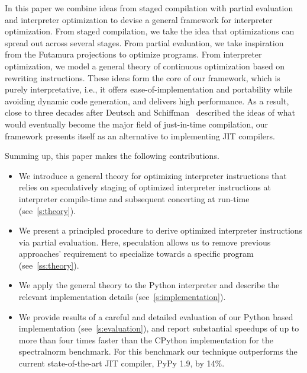 \documentclass[preprint,10pt]{popl14conf}
\begin{document}
In this paper we combine ideas from staged compilation with partial evaluation and interpreter
optimization to devise a general framework for interpreter optimization.
From staged compilation, we take the idea that optimizations can spread out across several stages.
From partial evaluation, we take inspiration from the Futamura projections to optimize programs.
From interpreter optimization, we model a general theory of continuous optimization based on
rewriting instructions.
These ideas form the core of our framework, which is purely interpretative, i.e., it offers
ease-of-implementation and portability while avoiding dynamic code generation, and delivers high
performance.
As a result, close to three decades after Deutsch and Schiffman~\cite{deutsch.schiffman+84}
described the ideas of what would eventually become the major field of just-in-time compilation, our
framework presents itself as an alternative to implementing JIT compilers.

Summing up, this paper makes the following contributions.
\begin{itemize}
\item We introduce a general theory for optimizing interpreter instructions that relies on
  speculatively staging of optimized interpreter instructions at interpreter compile-time and
  subsequent concerting at run-time (see~\autoref{s:theory}).


\item We present a principled procedure to derive optimized interpreter instructions via partial
  evaluation.
  Here, speculation allows us to remove previous approaches' requirement to specialize
  towards a specific program (see~\autoref{ss:theory}).

\item We apply the general theory to the Python interpreter and describe the relevant implementation
  details (see~\autoref{s:implementation}).

\item We provide results of a careful and detailed evaluation of our Python based implementation
  (see~\autoref{s:evaluation}), and report substantial speedups of up to more than four times faster
  than the CPython implementation for the \textsf{spectralnorm} benchmark.
  For this benchmark our technique outperforms the current state-of-the-art JIT compiler, PyPy 1.9,
  by 14\%.
\end{itemize}
\end{document}
